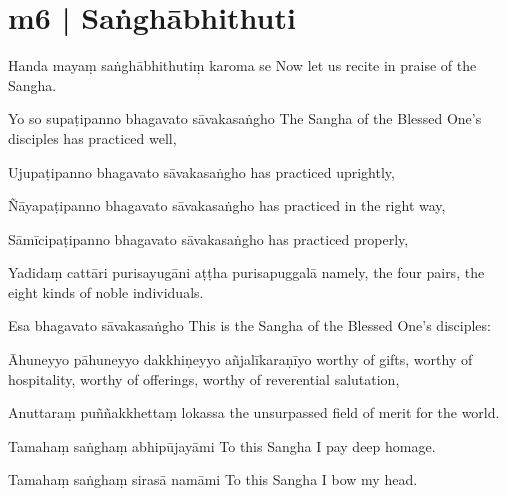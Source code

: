 \section*{m6 | Saṅghābhithuti}

\begin{chantsubsection}
  \chantline
    {Handa mayaṃ saṅghābhithutiṃ karoma se}
    {Now let us recite in praise of the Sangha.}

  \chantline
    {Yo so supaṭipanno bhagavato sāvakasaṅgho}
    {The Sangha of the Blessed One’s disciples has practiced well,}

  \chantline
    {Ujupaṭipanno bhagavato sāvakasaṅgho}
    {has practiced uprightly,}

  \chantline
    {Ñāyapaṭipanno bhagavato sāvakasaṅgho}
    {has practiced in the right way,}

  \chantline
    {Sāmīcipaṭipanno bhagavato sāvakasaṅgho}
    {has practiced properly,}

  \chantline
    {Yadidaṃ cattāri purisayugāni aṭṭha purisapuggalā}
    {namely, the four pairs, the eight kinds of noble individuals.}

  \chantline
    {Esa bhagavato sāvakasaṅgho}
    {This is the Sangha of the Blessed One’s disciples:}

  \chantline
    {Āhuneyyo pāhuneyyo dakkhiṇeyyo añjalīkaraṇīyo}
    {worthy of gifts, worthy of hospitality, worthy of offerings, worthy of reverential salutation,}

  \chantline
    {Anuttaraṃ puññakkhettaṃ lokassa}
    {the unsurpassed field of merit for the world.}

  \chantline
    {Tamahaṃ saṅghaṃ abhipūjayāmi}
    {To this Sangha I pay deep homage.}

  \chantline
    {Tamahaṃ saṅghaṃ sirasā namāmi}
    {To this Sangha I bow my head.}

\end{chantsubsection}
